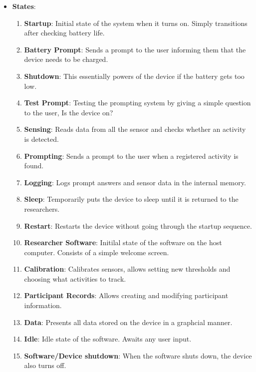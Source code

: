 \documentclass[12pt]{article}
\begin{document}
\begin{itemize}
\item \textbf{States}:
	\begin{enumerate}
		\item \textbf{Startup}: Initial state of the system when it turns on. Simply transitions after checking battery life.           
		\item \textbf{Battery Prompt}: Sends a prompt to the user informing them that the device needs to be charged.
		\item \textbf{Shutdown}: This essentially powers of the device if the battery gets too low. 
		\item \textbf{Test Prompt}: Testing the prompting system by giving a simple question to the user, Is the device on?
		\item \textbf{Sensing}: Reads data from all the sensor and checks whether an activity is detected.
		\item \textbf{Prompting}: Sends a prompt to the user when a registered activity is found. 
		\item \textbf{Logging}: Logs prompt answers and sensor data in the internal memory.
		\item \textbf{Sleep}: Temporarily puts the device to sleep until it is returned to the researchers.
		\item \textbf{Restart}: Restarts the device without going through the startup sequence.
		\item \textbf{Researcher Software}: Initilal state of the software on the host computer. Consists of a simple welcome screen.
		\item \textbf{Calibration}: Calibrates sensors, allows setting new thresholds and choosing what activities to track.
		\item \textbf{Participant Records}: Allows creating and modifying participant information.
		\item \textbf{Data}: Presents all data stored on the device in a graphcial manner.
		\item \textbf{Idle}: Idle state of the software. Awaits any user input.
		\item \textbf{Software/Device shutdown}: When the software shuts down, the device also turns off.
	\end{enumerate}
\end{itemize}
\end{document}
